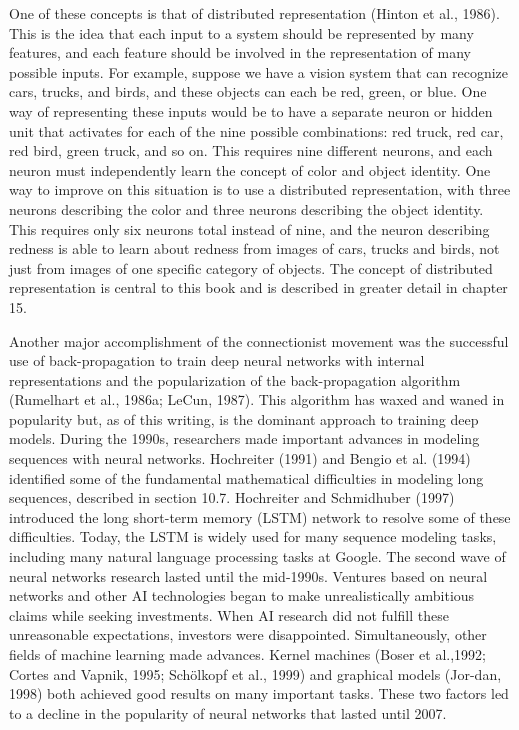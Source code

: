 \documentclass[11pt]{article}
\begin{document}
One of these concepts is that of distributed representation (Hinton et al., 1986).
This is the idea that each input to a system should be represented by many features, and each feature should be involved in the representation of many possible inputs.
For example, suppose we have a vision system that can recognize cars, trucks, and birds, and these objects can each be red, green, or blue.
One way of representing these inputs would be to have a separate neuron or hidden unit that activates for each of the nine possible combinations: red truck, red car, red bird, green truck, and so on.
This requires nine different neurons, and each neuron must independently learn the concept of color and object identity.
One way to improve on this situation is to use a distributed representation, with three neurons describing the color and three neurons describing the object identity.
This requires only six neurons total instead of nine, and the neuron describing redness is able to learn about redness from images of cars, trucks and birds, not just from images of one specific category of objects.
The concept of distributed representation is central to this book and is described in greater detail in chapter 15.

Another major accomplishment of the connectionist movement was the successful use of back-propagation to train deep neural networks with internal representations and the popularization of the back-propagation algorithm (Rumelhart et al., 1986a; LeCun, 1987).
This algorithm has waxed and waned in popularity but, as of this writing, is the dominant approach to training deep models.
During the 1990s, researchers made important advances in modeling sequences with neural networks.
Hochreiter (1991) and Bengio et al. (1994) identified some of the fundamental mathematical diﬃculties in modeling long sequences, described in section 10.7.
Hochreiter and Schmidhuber (1997) introduced the long short-term memory (LSTM) network to resolve some of these diﬃculties.
Today, the LSTM is widely used for many sequence modeling tasks, including many natural language processing tasks at Google.
The second wave of neural networks research lasted until the mid-1990s.
Ventures based on neural networks and other AI technologies began to make unrealistically ambitious claims while seeking investments.
When AI research did not fulfill these unreasonable expectations, investors were disappointed.
Simultaneously, other fields of machine learning made advances.
Kernel machines (Boser et al.,1992; Cortes and Vapnik, 1995; Schölkopf et al., 1999) and graphical models (Jor-dan, 1998) both achieved good results on many important tasks.
These two factors led to a decline in the popularity of neural networks that lasted until 2007.
\end{document}
